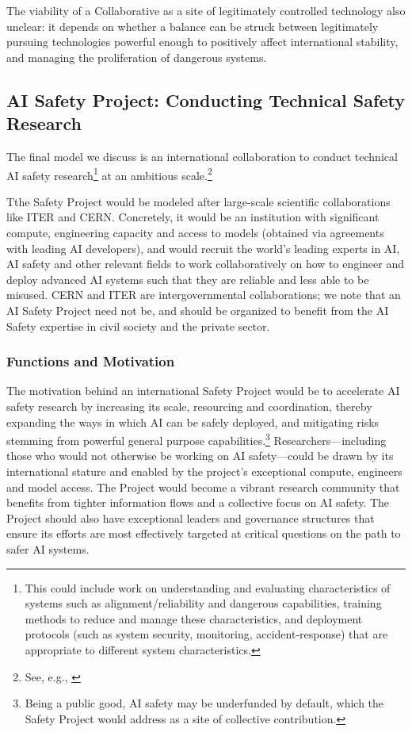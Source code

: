 \documentclass[12pt]{article}
\begin{document}
The viability of a Collaborative as a site of legitimately controlled
technology also unclear: it depends on whether a balance can be struck
between legitimately pursuing technologies powerful enough to positively
affect international stability, and managing the proliferation of
dangerous systems.


\subsection{AI Safety Project: Conducting Technical Safety
Research}

The final model we discuss is an international collaboration to conduct technical AI
safety research\footnote{This could include work on
  understanding and evaluating characteristics of systems such as
  alignment/reliability and dangerous capabilities, training methods to
  reduce and manage these characteristics, and deployment protocols
  (such as system security, monitoring, accident-response) that are
  appropriate to different system characteristics.} at an ambitious
scale.\footnote{See, e.g., \cite{dubner_satya_nodate, hammond_opinion_2023}}

Tthe Safety Project would be modeled after
large-scale scientific collaborations like ITER and CERN. Concretely, it
would be an institution with significant compute, engineering capacity
and access to models (obtained via agreements with leading AI
developers), and would recruit the world's leading experts in AI, AI
safety and other relevant fields to work collaboratively on how to
engineer and deploy advanced AI systems such that they are reliable and
less able to be misused. CERN and ITER are intergovernmental
collaborations; we note that an AI Safety Project need not be, and should be
organized to benefit from the AI Safety expertise in civil society and 
the private sector.


\subsubsection*{Functions and
Motivation}

The motivation behind an international Safety Project would be to
accelerate AI safety research by increasing its scale, resourcing and
coordination, thereby expanding the ways in which AI can be safely
deployed, and mitigating risks stemming from powerful general purpose
capabilities.\footnote{Being a public good, AI safety may be underfunded
  by default, which the Safety Project would address as a site of
  collective contribution.} Researchers---including those who would not
otherwise be working on AI safety---could be drawn by its international
stature and enabled by the project's exceptional compute, engineers and
model access. The Project would become a vibrant research community that
benefits from tighter information flows and a collective focus on AI
safety. The Project should also have exceptional leaders and governance
structures that ensure its efforts are most effectively targeted at
critical questions on the path to safer AI systems.
\end{document}
